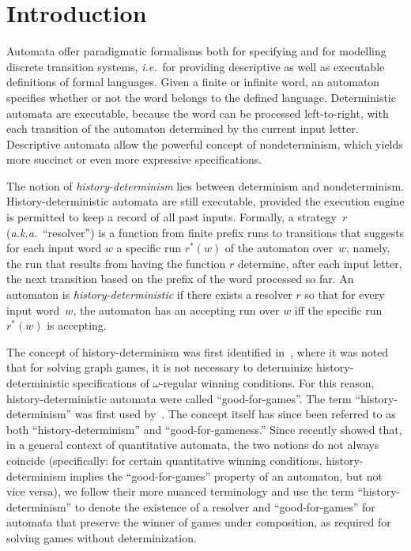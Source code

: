 	\section{Introduction}
	\label{sec:intro}


Automata offer paradigmatic formalisms both for specifying and for modelling
discrete transition systems,
\emph{i.e.}~for providing descriptive as well as executable definitions of
formal languages.
Given a finite or infinite word, an automaton specifies whether or not the
word belongs to the defined language.
Deterministic automata are executable, because the word can be processed
left-to-right, with each transition of the automaton determined by
the current input letter.
Descriptive automata allow the powerful concept of nondeterminism, which
yields more succinct or even more expressive specifications.

The notion of \emph{history-determinism} lies between determinism and
nondeterminism.
History-deterministic automata are still executable, provided the execution
engine is permitted to keep a record of all past inputs. 
Formally, a strategy~$r$ (\emph{a.k.a.}~``resolver'') is a function from
finite prefix runs to transitions that suggests for each input word $w$
a specific run $r^*(w)$ of the automaton over~$w$,
namely, the run that results from having the function $r$ determine, after
each input letter, the next transition based on the prefix of the word
processed so far.
An automaton is \emph{history-deterministic} if there exists a resolver $r$
so that for every input word~$w$, the automaton has an accepting run over
$w$ iff the specific run $r^*(w)$ is accepting.

The concept of history-determinism was first identified in~\cite{HP06},
where it was noted that for solving graph games, it is not necessary to
determinize history-deterministic specifications of $\omega$-regular
winning conditions.
For this reason, history-deterministic automata were called
``good-for-games''. %
The term ``history-determinism'' was first used by~\cite{Col09}.
The concept itself has since been referred to %
as both
``history-determinism'' and ``good-for-gameness.''
Since \cite{BL21} recently showed that, in a general context of quantitative
automata, the two notions do not always coincide
(specifically: for certain quantitative winning conditions, history-determinism
implies the ``good-for-games'' property of an automaton, but not vice versa),
we follow their more nuanced terminology and use the term ``history-determinism''
to denote the existence of a resolver and ``good-for-games'' for automata that preserve the winner of games under composition, as required for solving games without determinization.

